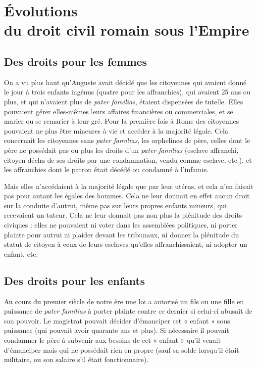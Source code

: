
\chapter[Évolutions du droit civil romain sous l'Empire]{Évolutions\\du droit civil romain sous l'Empire}


\section{Des droits pour les femmes}

 On a vu plus haut qu'Auguste avait décidé que les citoyennes qui avaient donné le jour à trois enfants ingénus (quatre pour les affranchies), qui avaient 25 ans ou plus, et qui n'avaient plus de \emph{pater familias}, étaient dispensées de tutelle. Elles pouvaient gérer elles-mêmes leurs affaires financières ou commerciales, et se marier ou se remarier à leur gré. Pour la première fois à Rome des citoyennes pouvaient ne plus être mineures à vie et accéder à la majorité légale. Cela concernait les citoyennes sans \emph{pater familias}, les orphelines de père, celles dont le père ne possédait pas ou plus les droits d'un \emph{pater familias} (esclave affranchi, citoyen déchu de ses droits par une condamnation, vendu comme esclave, etc.), et les affranchies dont le patron était décédé ou condamné à l'infamie. 

 Mais elles n'accédaient à la majorité légale que par leur utérus, et cela n'en faisait pas pour autant les égales des hommes. Cela ne leur donnait en effet aucun droit sur la conduite d'autrui, même pas sur leurs propres enfants mineurs, qui recevaient un tuteur. Cela ne leur donnait pas non plus la plénitude des droits civiques : elles ne pouvaient ni voter dans les assemblées politiques, ni porter plainte pour autrui ni plaider devant les tribunaux, ni donner la plénitude du statut de citoyen à ceux de leurs esclaves qu'elles affranchissaient, ni adopter un enfant, etc.
 
 
\section{Des droits pour les enfants}

 Au cours du premier siècle de notre ère une loi a autorisé un fils ou une fille en puissance de \emph{pater familias} à porter plainte contre ce dernier si celui-ci abusait de son pouvoir. Le magistrat pouvait décider d'émanciper cet « enfant » sous puissance (qui pouvait avoir quarante ans et plus). Si nécessaire il pouvait condamner le père à subvenir aux besoins de cet « enfant » qu'il venait d'émanciper mais qui ne possédait rien en propre (sauf sa solde lorsqu'il était militaire, ou son salaire s'il était fonctionnaire). 
 
